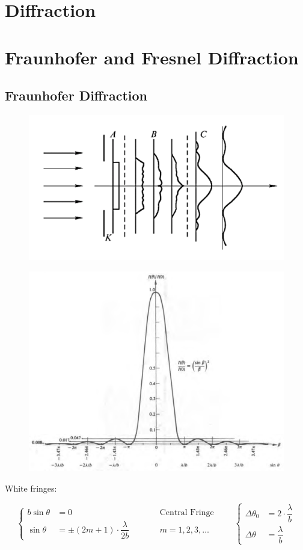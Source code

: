 \chapter{Diffraction}

\chapter{Fraunhofer and Fresnel Diffraction}

\section{Fraunhofer Diffraction}

\begin{figure}[H]
  \centering
  \includegraphics[width=0.6\linewidth]{figures/Fraunhofer-Fresnel-Diffraction}
\end{figure}

\begin{figure}[H]
  \centering
  \includegraphics[width=0.7\linewidth]{figures/Fraunhofer-Diffraction-Irradance}
\end{figure}

White fringes:

\begin{equation*}
  \left\{
    \begin{aligned}
      b \sin \theta &= 0 && \quad\quad \text{Central Fringe} \\
      \sin \theta &= \pm \left( 2 m + 1 \right) \cdot \dfrac{\lambda}{2b} && \quad\quad m = 1,2,3,\dots
    \end{aligned}
  \right.
  \quad\quad 
  \left\{
    \begin{aligned}
      \Delta \theta_0 &= 2 \cdot \dfrac{\lambda}{b} \\
      \Delta \theta &= \dfrac{\lambda}{b} 
    \end{aligned}
  \right.
\end{equation*}

